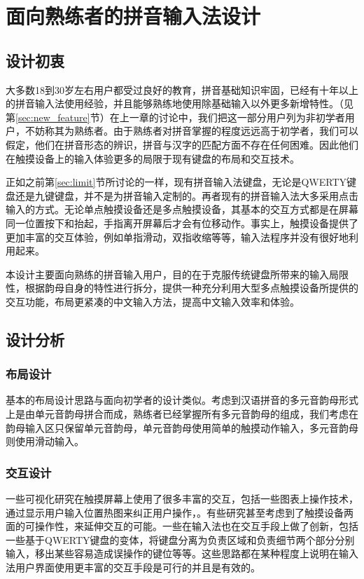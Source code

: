 \chapter{面向熟练者的拼音输入法设计}
  \section{设计初衷}

  大多数18到30岁左右用户都受过良好的教育，拼音基础知识牢固，已经有十年以上的拼音输入法使用经验，并且能够熟练地使用除基础输入以外更多新增特性。（见第\ref{sec:new_feature}节）在上一章的讨论中，我们把这一部分用户列为非初学者用户，不妨称其为熟练者。由于熟练者对拼音掌握的程度远远高于初学者，我们可以假定，他们在拼音形态的辨识，拼音与汉字的匹配方面不存在任何困难。因此他们在触摸设备上的输入体验更多的局限于现有键盘的布局和交互技术。

  正如之前第\ref{sec:limit}节所讨论的一样，现有拼音输入法键盘，无论是QWERTY键盘还是九键键盘，并不是为拼音输入定制的。再者现有的拼音输入法大多采用点击输入的方式。无论单点触摸设备还是多点触摸设备，其基本的交互方式都是在屏幕同一位置按下和抬起，手指离开屏幕后才会有位移动作。事实上，触摸设备提供了更加丰富的交互体验，例如单指滑动，双指收缩等等，输入法程序并没有很好地利用起来。

  本设计主要面向熟练的拼音输入用户，目的在于克服传统键盘所带来的输入局限性，根据韵母自身的特性进行拆分，提供一种充分利用大型多点触摸设备所提供的交互功能，布局更紧凑的中文输入方法，提高中文输入效率和体验。

  \section{设计分析}
  \subsection{布局设计}

  基本的布局设计思路与面向初学者的设计类似。考虑到汉语拼音的多元音韵母形式上是由单元音韵母拼合而成，熟练者已经掌握所有多元音韵母的组成，我们考虑在韵母输入区只保留单元音韵母，单元音韵母使用简单的触摸动作输入，多元音韵母则使用滑动输入。

  \subsection{交互设计}

  一些可视化研究在触摸屏幕上使用了很多丰富的交互，包括一些图表上操作技术\supercite{sadana2014designing}，通过显示用户输入位置热图来纠正用户操作\supercite{rudchenko2011text}，。有些研究甚至考虑到了触摸设备两面的可操作性，来延伸交互的可能\supercite{buschek2014improving, shen2009double}。一些在输入法也在交互手段上做了创新，包括一些基于QWERTY键盘的变体\supercite{findlater2012beyond, shin2009multi}，将键盘分离为负责区域和负责细节两个部分分别输入\supercite{don2010applying}，移出某些容易造成误操作的键位\supercite{arif2014experimental}等等。这些思路都在某种程度上说明在输入法用户界面使用更丰富的交互手段是可行的并且是有效的。

